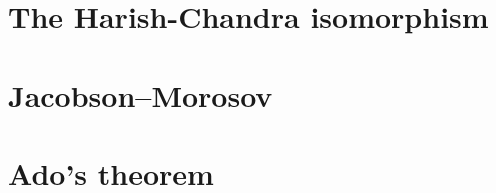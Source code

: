 \section{The Harish-Chandra isomorphism}
\label{section-HC-isomorphism}

\section{Jacobson--Morosov}
\label{section-Jacobson-Morosov}

\section{Ado's theorem}
\label{section-Ado}
















